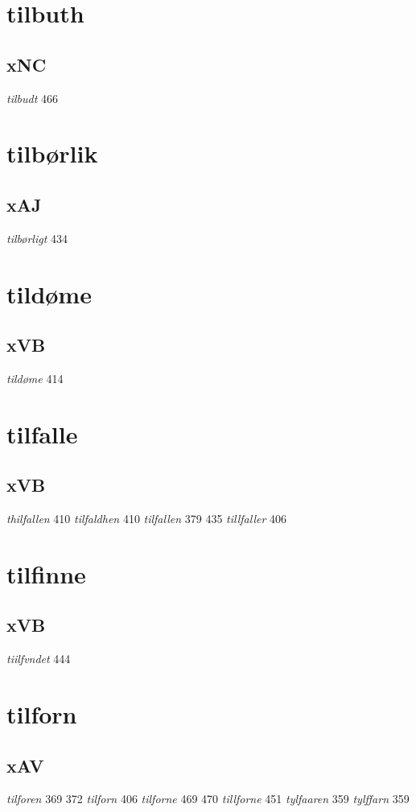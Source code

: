 \documentclass[a4paper,twocolumn]{article}
\begin{document}
\section{tilbuth}
\label{sec:orgd5ac1b9}
\subsection{xNC}
\label{sec:org2eb9ef6}
\emph{tilbudt} 466 
\section{tilbørlik}
\label{sec:orga996f65}
\subsection{xAJ}
\label{sec:orgc5626e0}
\emph{tilbørligt} 434 
\section{tildøme}
\label{sec:orgaa76071}
\subsection{xVB}
\label{sec:org6e0f999}
\emph{tildøme} 414 
\section{tilfalle}
\label{sec:org543c4f5}
\subsection{xVB}
\label{sec:org2b6e8c6}
\emph{thilfallen} 410 \emph{tilfaldhen} 410 \emph{tilfallen} 379 435 \emph{tillfaller} 406 
\section{tilfinne}
\label{sec:orga2e9f6e}
\subsection{xVB}
\label{sec:orge5d8faf}
\emph{tiilfvndet} 444 
\section{tilforn}
\label{sec:orge9535c0}
\subsection{xAV}
\label{sec:org5756616}
\emph{tilforen} 369 372 \emph{tilforn} 406 \emph{tilforne} 469 470 \emph{tillforne} 451 \emph{tylfaaren} 359 \emph{tylffarn} 359 
\end{document}
